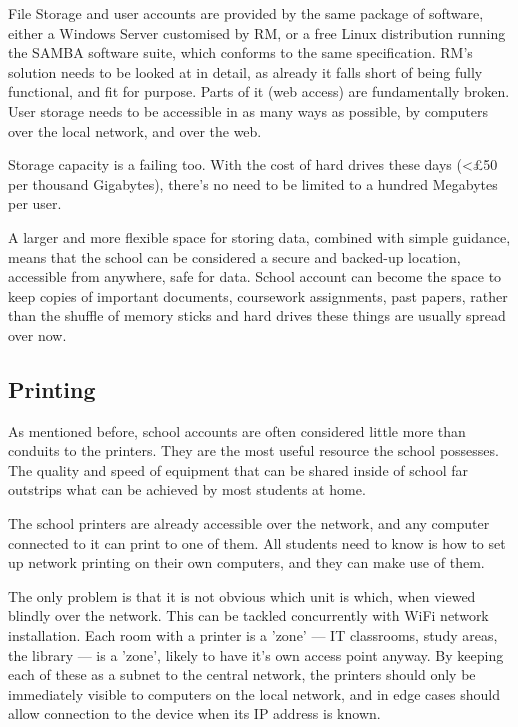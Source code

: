 \documentclass[a4paper,leqno,titlepage]{article}
\begin{document}
File Storage and user accounts are provided by the same package of software,
either a Windows Server customised by RM, or a free Linux distribution
running the SAMBA software suite, which conforms to the same specification.
RM's solution needs to be looked at in detail, as already it falls short of
being fully functional, and fit for purpose. Parts of it (web access) are
fundamentally broken. User storage needs to be accessible in as many ways
as possible, by computers over the local network, and over the web.


Storage capacity is a failing too. With the cost of hard drives
these days (<£50 per thousand Gigabytes), there's no need to be limited to
a hundred Megabytes per user.


A larger and more flexible space for storing data, combined with simple
guidance, means that the school can be considered a secure and backed-up
location, accessible from anywhere, safe for data.
School account can become the space to keep copies of important documents,
coursework assignments, past papers, rather than the shuffle of memory sticks
and hard drives these things are usually spread over now.


\subsection{Printing}

As mentioned before, school accounts are often considered little more than
conduits to the printers. They are the most useful resource the school
possesses. The quality and speed of equipment that can be shared inside of
school far outstrips what can be achieved by most students at home.


The school printers are already accessible over the network, and any computer
connected to it can print to one of them. All students need to know is how to
set up network printing on their own computers, and they can make use of them.

The only problem is that it is not obvious which unit is which, when viewed
blindly over the network. This can be tackled concurrently with WiFi network
installation. Each room with a printer is a 'zone' --- IT classrooms,
study areas, the library --- is a 'zone', likely to have it's own access point
anyway. By keeping each of these as a subnet to the central network, the
printers should only be immediately visible to computers on the local network,
and in edge cases should allow connection to the device when its IP address
is known.
\end{document}
